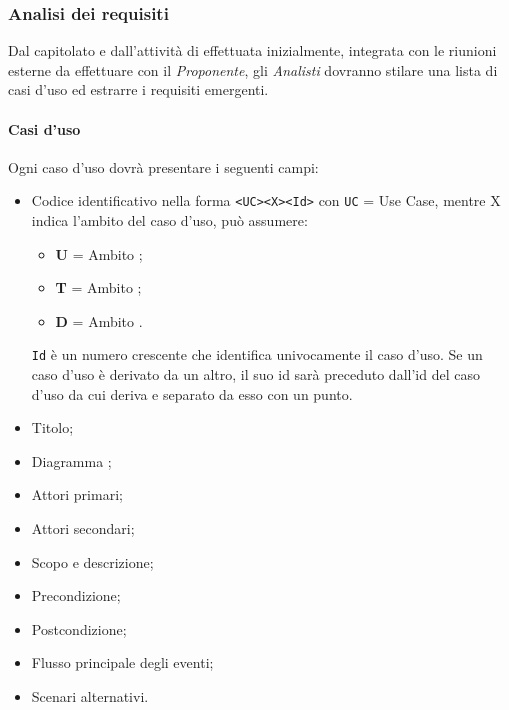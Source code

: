 \documentclass{scalatekids-article}
\begin{document}
\subsubsection{Analisi dei requisiti}
Dal capitolato e dall'attività di  effettuata inizialmente,
integrata con le riunioni esterne da effettuare con il \textit{Proponente}, gli
\textit{Analisti} dovranno stilare una lista di casi d'uso ed estrarre i
requisiti emergenti.
\paragraph{Casi d'uso}
Ogni caso d'uso dovrà presentare i seguenti campi:
\begin{itemize}
  \item Codice identificativo nella forma \verb=<UC><X><Id>= con \verb=UC= = Use
    Case, mentre X indica l'ambito del caso d'uso, può assumere:
    \begin{itemize}
    \item\textbf{U} = Ambito ;
    \item\textbf{T} = Ambito ;
    \item\textbf{D} = Ambito .
    \end{itemize}
    \verb=Id= è un numero crescente che identifica univocamente il
    caso d'uso. Se un caso d'uso è derivato da un altro, il suo id sarà
    preceduto dall'id del caso d'uso da cui deriva e separato da esso con un
    punto.
  \item Titolo;
  \item Diagramma ;
  \item Attori primari;
  \item Attori secondari;
  \item Scopo e descrizione;
  \item Precondizione;
  \item Postcondizione;
  \item Flusso principale degli eventi;
  \item Scenari alternativi.
\end{itemize}
\end{document}
